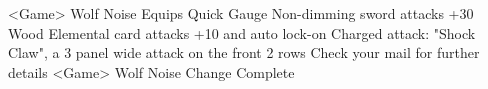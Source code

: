 <Game> Wolf Noise Equips Quick Gauge 
Non-dimming sword attacks +30 
Wood Elemental card attacks +10 and auto lock-on 
Charged attack: "Shock Claw", a 3 panel wide attack on the front 2 rows 
Check your mail for further details 
<Game> Wolf Noise Change Complete 
